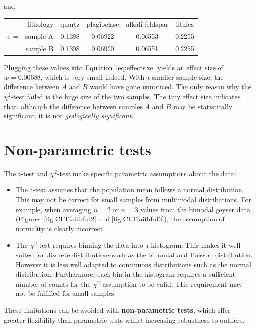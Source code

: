 \noindent and

\begin{center}
  \begin{tabular}{rr|cccc}
    & lithology & quartz & plagioclase & alkali feldspar & lithics  \\
    \cline{2-6}
    $e$ = & sample A & 0.1398 & 0.06922 & 0.06553 & 0.2255 \\
    & sample B & 0.1398 & 0.06920 & 0.06551 & 0.2255
  \end{tabular}
\end{center}

Plugging these values into Equation~\ref{eq:effectsize} yields an
effect size of $w=0.00688$, which is very small indeed. With a smaller
sample size, the difference between $A$ and $B$ would have gone
unnoticed.  The only reason why the $\chi^2$-test failed is the huge
size of the two samples. The tiny effect size indicates that, although
the difference between samples $A$ and $B$ may be statistically
significant, it is not \textit{geologically significant}.

\section{Non-parametric tests}
\label{sec:nonparametric}

The t-test and $\chi^2$-test make specific parametric assumptions
about the data:

\begin{itemize}
  \item The t-test assumes that the population mean follows a normal
    distribution. This may not be correct for small samples from
    multimodal distributions. For example, when averaging $n=2$ or
    $n=3$ values from the bimodal geyser data
    (Figures~\ref{fig:CLTfaithful2} and \ref{fig:CLTfaithful3}), the
    assumption of normality is clearly incorrect.
  \item The $\chi^2$-test requires binning the data into a
    histogram. This makes it well suited for discrete distributions
    such as the binomial and Poisson distribution. However it is less
    well adapted to continuous distributions such as the normal
    distribution. Furthermore, each bin in the histogram requires a
    sufficient number of counts for the $\chi^2$-assumption to be
    valid. This requirement may not be fulfilled for small samples.
\end{itemize}

These limitations can be avoided with \textbf{non-parametric tests},
which offer greater flexibility than parametric tests whilst
increasing robustness to outliers.\\

